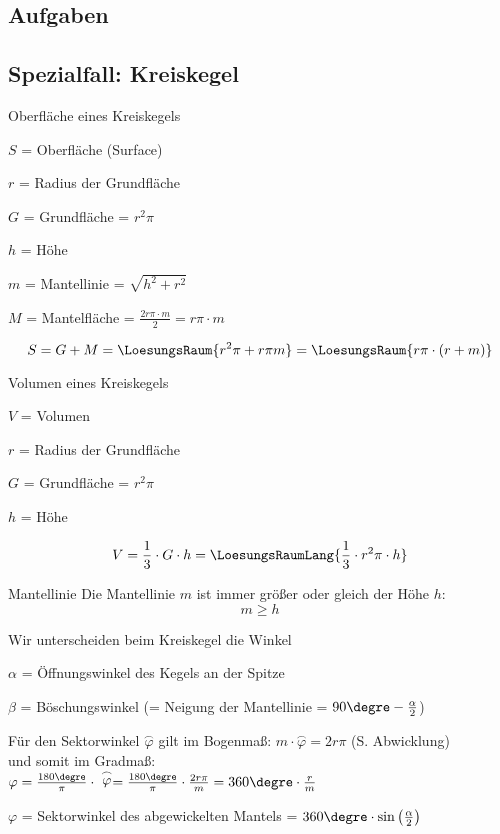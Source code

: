 \subsection*{Aufgaben}
\newpage

\subsection{Spezialfall: Kreiskegel}


\begin{gesetz}{Oberfläche eines Kreiskegels}{}

  $S$ = Oberfläche (Surface)

  $r$ = Radius der Grundfläche
  
  $G$ = Grundfläche = $r^2\pi$

  $h$ = Höhe

  $m$ = Mantellinie = $\sqrt{h^2 + r^2}$
  
  $M$ = Mantelfläche = $\frac{2r\pi \cdot{} m}2 = r\pi\cdot{}m$

  
  $$S = G + M = \LoesungsRaum{r^2\pi + r\pi m} = \LoesungsRaum{r\pi\cdot{}(r+m)}$$
\end{gesetz}


\begin{gesetz}{Volumen eines Kreiskegels}{}

  $V$ = Volumen

  $r$ = Radius der Grundfläche
  
  $G$ = Grundfläche = $r^2\pi$

  $h$ = Höhe

  $$V = \frac13\cdot{} G\cdot{}h = \LoesungsRaumLang{\frac13 \cdot{} r^2\pi \cdot{} h}$$
\end{gesetz}


\begin{bemerkung}{Mantellinie}{}
  Die Mantellinie $m$ ist immer größer oder gleich der Höhe $h$:
  $$m \ge{} h$$
\end{bemerkung}

\newpage


\begin{bemerkung}{}{}
  Wir unterscheiden beim Kreiskegel die Winkel

  $\alpha$ = Öffnungswinkel des Kegels an der Spitze

  $\beta$ = Böschungswinkel (= Neigung der Mantellinie = $90\degre - \frac{\alpha}{2}$)

  Für den Sektorwinkel $\stackrel{\frown}{\varphi}$ gilt im Bogenmaß: $m\cdot\stackrel{\frown}{\varphi} = 2r\pi$ (S. Abwicklung)\\
  und somit im Gradmaß:\\ $\varphi = \frac{180\degre}\pi \cdot{} \stackrel{\frown}{\varphi} = \frac{180\degre}\pi \cdot \frac{2r\pi}m = 360\degre\cdot{}\frac{r}m$ 
  
  $\varphi$ = Sektorwinkel des abgewickelten Mantels = $360\degre \cdot \sin\left(\frac{\alpha}2\right)$

\end{bemerkung}

